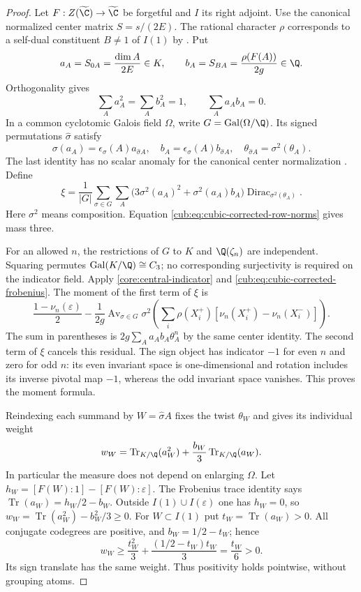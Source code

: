 \begin{proof}
Let $F:Z(\widetilde{\C})\to\widetilde{\C}$ be forgetful
and $I$ its right adjoint. Use the canonical normalized center matrix
$S=s/(2E)$. The rational character $\rho$ corresponds to a self-dual
constituent $B\ne1$ of $I(1)$ by
\cite[Example~2.9 and Theorem~2.13]{Ostrik3}. Put
\[
 a_A=S_{0A}=\frac{\dim A}{2E}\in K,\qquad
 b_A=S_{BA}=\frac{\rho(F(A))}{2g}\in\Q.
\]
Orthogonality gives
\begin{equation}\label{cub:eq:cubic-corrected-row-norms}
 \sum_Aa_A^2=\sum_Ab_A^2=1,\qquad \sum_Aa_Ab_A=0.
\end{equation}
In a common cyclotomic Galois field $\Omega$, write
$G=\operatorname{Gal}(\Omega/\Q)$. Its signed permutations
$\widehat\sigma$ satisfy
\begin{equation}\label{cub:eq:cubic-corrected-galois}
 \sigma(a_A)=\epsilon_\sigma(A)a_{\widehat\sigma A},\quad
 b_A=\epsilon_\sigma(A)b_{\widehat\sigma A},\quad
 \theta_{\widehat\sigma A}=\sigma^2(\theta_A).
\end{equation}
The last identity has no scalar anomaly for the canonical center
normalization \cite[Lemma~4.2 and Section~4.1]{DLN}. Define
\[
 \xi=\frac1{|G|}\sum_{\sigma\in G}\sum_A
 \bigl(3\sigma^2(a_A)^2+\sigma^2(a_A)b_A\bigr)
 \operatorname{Dirac}_{\sigma^2(\theta_A)}.
\]
Here $\sigma^2$ means composition. Equation
\eqref{cub:eq:cubic-corrected-row-norms} gives mass three.

For an allowed $n$, the restrictions of $G$ to $K$ and
$\Q(\zeta_n)$ are independent. Squaring permutes
$\operatorname{Gal}(K/\Q)\cong C_3$; no corresponding
surjectivity is required on the indicator field.
Apply \eqref{core:central-indicator} and
\eqref{cub:eq:cubic-corrected-frobenius}. The moment of the first
term of $\xi$ is
\[
 \frac{1-\nu_n(\varepsilon)}2
 -\frac1{2g}\operatorname{Av}_{\sigma\in G}
 \sigma^2\!\left(\sum_i\rho(X_i^+)
          [\nu_n(X_i^+)-\nu_n(X_i^-)]\right).
\]
The sum in parentheses is $2g\sum_Aa_Ab_A\theta_A^n$ by the same
center identity. The second term of $\xi$ cancels this residual.
The sign object has indicator $-1$ for even $n$ and zero for odd $n$:
its even invariant space is one-dimensional and rotation includes its
inverse pivotal map $-1$, whereas the odd invariant space vanishes.
This proves the moment formula.

Reindexing each summand by $W=\widehat\sigma A$ fixes the twist
$\theta_W$ and gives its individual weight
\begin{equation}\label{cub:eq:cubic-corrected-weight}
 w_W=\operatorname{Tr}_{K/\Q}(a_W^2)
              +\frac{b_W}{3}\operatorname{Tr}_{K/\Q}(a_W).
\end{equation}
In particular the measure does not depend on enlarging $\Omega$.
Let $h_W=[F(W):1]-[F(W):\varepsilon]$. The Frobenius trace identity
says $\operatorname{Tr}(a_W)=h_W/2-b_W$.
Outside $I(1)\cup I(\varepsilon)$ one has $h_W=0$, so
$w_W=\operatorname{Tr}(a_W^2)-b_W^2/3\ge0$.
For $W\subset I(1)$ put $t_W=\operatorname{Tr}(a_W)>0$.
All conjugate codegrees are positive, and $b_W=1/2-t_W$; hence
\[
 w_W\ge\frac{t_W^2}{3}+\frac{(1/2-t_W)t_W}{3}
       =\frac{t_W}{6}>0.
\]
Its sign translate has the same weight. Thus positivity holds
pointwise, without grouping atoms.


\end{proof}
